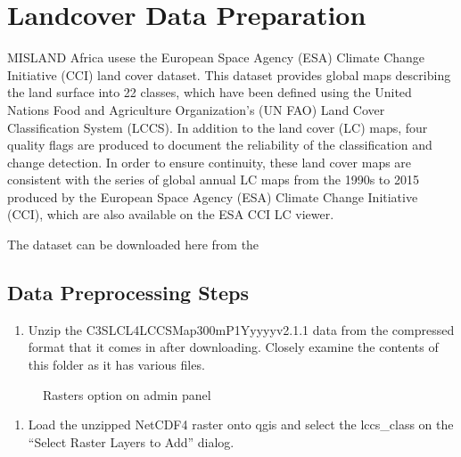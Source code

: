 \documentclass[letterpaper,10pt,english]{sphinxmanual}
\let\sphinxpxdimen\pdfpxdimen\else\newdimen\sphinxpxdimen
\begin{document}
\sphinxstepscope


\chapter{Landcover Data Preparation}
\label{\detokenize{Preprocessing/Landcover:landcover-data-preparation}}\label{\detokenize{Preprocessing/Landcover::doc}}
\sphinxAtStartPar
MISLAND Africa usese the European Space Agency (ESA) Climate Change Initiative (CCI) land cover dataset. This dataset provides global maps describing the land surface into 22 classes, which have been defined using the United Nations Food and Agriculture Organization’s (UN FAO) Land Cover Classification System (LCCS). In addition to the land cover (LC) maps, four quality flags are produced to document the reliability of the classification and change detection.
In order to ensure continuity, these land cover maps are consistent with the series of global annual LC maps from the 1990s to 2015 produced by the European Space Agency (ESA) Climate Change Initiative (CCI), which are also available on the ESA CCI LC viewer.

\sphinxAtStartPar
The dataset can be downloaded here from the 


\section{Data Preprocessing Steps}
\label{\detokenize{Preprocessing/Landcover:data-preprocessing-steps}}\begin{enumerate}
%
\item {} 
\sphinxAtStartPar
Unzip the C3S\sphinxhyphen{}LC\sphinxhyphen{}L4\sphinxhyphen{}LCCS\sphinxhyphen{}Map\sphinxhyphen{}300m\sphinxhyphen{}P1Y\sphinxhyphen{}yyyy\sphinxhyphen{}v2.1.1 data from the compressed format that it comes in after downloading. Closely examine the contents of this folder as it has various files.

\end{enumerate}

\begin{figure}[H]
\centering
\capstart

\noindent\sphinxincludegraphics[width=800\sphinxpxdimen,height=400\sphinxpxdimen]{{LC1}.png}
\caption{Rasters option on admin panel}\label{\detokenize{Preprocessing/Landcover:id3}}\end{figure}
\begin{enumerate}
%
\setcounter{enumi}{1}
\item {} 
\sphinxAtStartPar
Load the unzipped NetCDF4 raster onto qgis and select the lccs\_class on the “Select Raster Layers to Add” dialog.

\end{enumerate}
\end{document}
